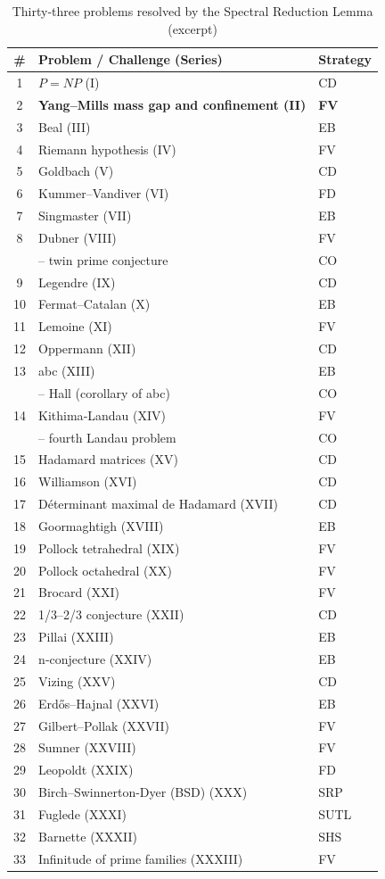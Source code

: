 \documentclass[11pt,a4paper]{article}
\begin{document}
\begin{center}
\small
\begin{longtable}{@{}cll@{}}
\caption{Thirty‑three problems resolved by the Spectral Reduction Lemma (excerpt)}\\
\toprule
\# & Problem / Challenge (Series) & Strategy \\
\midrule
1 & \(P = NP\) (I) & CD \\
2 & \textbf{Yang–Mills mass gap and confinement (II)} & \textbf{FV} \\
3 & Beal (III) & EB \\
4 & Riemann hypothesis (IV) & FV \\
5 & Goldbach (V) & CD \\
6 & Kummer–Vandiver (VI) & FD \\
7 & Singmaster (VII) & EB \\
8 & Dubner (VIII) & FV \\
   & \quad – twin prime conjecture & CO \\
9 & Legendre (IX) & CD \\
10 & Fermat–Catalan (X) & EB \\
11 & Lemoine (XI) & FV \\
12 & Oppermann (XII) & CD \\
13 & abc (XIII) & EB \\
   & \quad – Hall (corollary of abc) & CO \\
14 & Kithima‑Landau (XIV) & FV \\
    & \quad – fourth Landau problem & CO \\
15 & Hadamard matrices (XV) & CD \\
16 & Williamson (XVI) & CD \\
17 & Déterminant maximal de Hadamard (XVII) & CD \\
18 & Goormaghtigh (XVIII) & EB \\
19 & Pollock tetrahedral (XIX) & FV \\
20 & Pollock octahedral (XX) & FV \\
21 & Brocard (XXI) & FV \\
22 & 1/3–2/3 conjecture (XXII) & CD \\
23 & Pillai (XXIII) & EB \\
24 & n‑conjecture (XXIV) & EB \\
25 & Vizing (XXV) & CD \\
26 & Erdős–Hajnal (XXVI) & EB \\
27 & Gilbert–Pollak (XXVII) & FV \\
28 & Sumner (XXVIII) & FV \\
29 & Leopoldt (XXIX) & FD \\
30 & Birch–Swinnerton-Dyer (BSD) (XXX) & SRP \\
31 & Fuglede (XXXI) & SUTL \\
32 & Barnette (XXXII) & SHS \\
33 & Infinitude of prime families (XXXIII) & FV \\
\bottomrule
\end{longtable}
\end{center}
\end{document}
